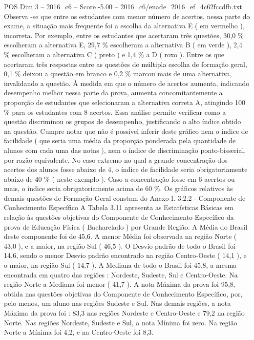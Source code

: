 \begin{textsample}{POS Dim 3 – 2016\_c6 – Score -5.00 – 2016\_c6/enade\_2016\_ef\_4c62fccdfb.txt}
Observa -se que entre os estudantes com menor número de acertos, nessa parte do exame, a situação mais frequente foi a escolha da alternativa E ( em vermelho ), incorreta.
Por exemplo, entre os estudantes que acertaram três questões, 30,0 \% escolheram a alternativa E, 29,7 \% escolheram a alternativa B ( em verde ), 2,4 \% escolheram a alternativa C ( preto ) e 1,4 \% a D ( roxo ).
Entre os que acertaram três respostas entre as questões de múltipla escolha de formação geral, 0,1 \% deixou a questão em branco e 0,2 \% marcou mais de uma alternativa, invalidando a questão.
À medida em que o número de acertos aumenta, indicando desempenho melhor nessa parte da prova, aumenta concomitantemente a proporção de estudantes que selecionaram a alternativa correta A, atingindo 100 \% para os estudantes com 8 acertos.
Essa análise permite verificar como a questão discriminou os grupos de desempenho, justificando o alto índice obtido na questão.
Cumpre notar que não é possível inferir deste gráfico nem o índice de facilidade ( que seria uma média da proporção ponderada pela quantidade de alunos com cada uma das notas ), nem o índice de discriminação ponto-bisserial, por razão equivalente.
No caso extremo no qual a grande concentração dos acertos dos alunos fosse abaixo de 4, o índice de facilidade seria obrigatoriamente abaixo de 40 \% ( neste exemplo ).
Caso a concentração fosse em 6 acertos ou mais, o índice seria obrigatoriamente acima de 60 \%.
Os gráficos relativos às demais questões de Formação Geral constam do Anexo I. 3.2.2 - Componente de Conhecimento Específico A Tabela 3.11 apresenta as Estatísticas Básicas em relação às questões objetivas do Componente de Conhecimento Específico da prova de Educação Física ( Bacharelado ) por Grande Região.
A Média do Brasil deste componente foi de 45,6.
A menor Média foi observada na região Norte ( 43,0 ), e a maior, na região Sul ( 46,5 ).
O Desvio padrão de todo o Brasil foi 14,6, sendo o menor Desvio padrão encontrado na região Centro-Oeste ( 14,1 ), e o maior, na região Sul ( 14,7 ).
A Mediana de todo o Brasil foi 45,8, a mesma encontrada em quatro das regiões : Nordeste, Sudeste, Sul e Centro-Oeste.
Na região Norte a Mediana foi menor ( 41,7 ).
A nota Máxima da prova foi 95,8, obtida nas questões objetivas do Componente de Conhecimento Específico, por, pelo menos, um aluno nas regiões Sudeste e Sul.
Nas demais regiões, a nota Máxima da prova foi : 83,3 nas regiões Nordeste e Centro-Oeste e 79,2 na região Norte.
Nas regiões Nordeste, Sudeste e Sul, a nota Mínima foi zero.
Na região Norte a Mínima foi 4,2, e na Centro-Oeste foi 8,3.

\end{textsample}
